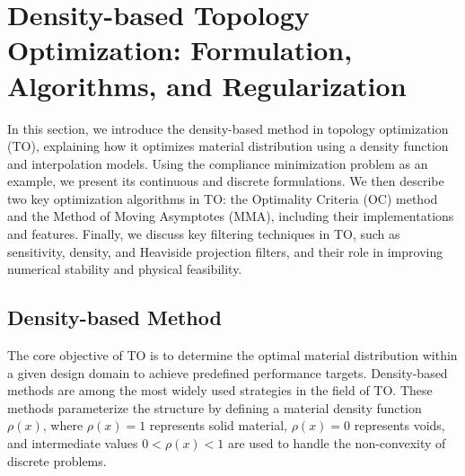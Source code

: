 \documentclass[mathpazo]{cicp}
\begin{document}
\section{Density-based Topology Optimization: Formulation, Algorithms, and Regularization}\label{sec:math}
In this section, we introduce the density-based method in topology optimization (TO), explaining how it optimizes material distribution using a density function and interpolation models. Using the compliance minimization problem as an example, we present its continuous and discrete formulations. We then describe two key optimization algorithms in TO: the Optimality Criteria (OC) method and the Method of Moving Asymptotes (MMA), including their implementations and features. Finally, we discuss key filtering techniques in TO, such as sensitivity, density, and Heaviside projection filters, and their role in improving numerical stability and physical feasibility.

\subsection{Density-based Method}\label{sec:DbM}
The core objective of TO is to determine the optimal material distribution within a given design domain to achieve predefined performance targets. Density-based methods are among the most widely used strategies in the field of TO. These methods parameterize the structure by defining a material density function $\rho(x)$, where $\rho(x) = 1$ represents solid material, $\rho(x) = 0$ represents voids, and intermediate values $0 < \rho(x) < 1$ are used to handle the non-convexity of discrete problems.
\end{document}
